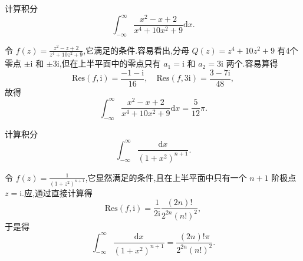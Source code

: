 \documentclass[../../main.tex]{subfiles}
\begin{document}
\begin{example}
计算积分
\[
\int_{-\infty}^{\infty} \frac{x^2 - x + 2}{x^4 + 10x^2 + 9} \mathrm{d}x.
\]
\end{example}
\begin{solution}
令 \( f(z) = \frac{z^2 - z + 2}{z^4 + 10z^2 + 9} \),它满足的条件.容易看出,分母 \( Q(z) = z^4 + 10z^2 + 9 \) 有4个零点 \( \pm \mathrm{i} \) 和 \( \pm 3\mathrm{i} \),但在上半平面中的零点只有 \( a_1 = \mathrm{i} \) 和 \( a_2 = 3\mathrm{i} \) 两个.容易算得
\[
\mathrm{Res}(f, \mathrm{i}) = \frac{-1 - \mathrm{i}}{16},
\quad
\mathrm{Res}(f, 3\mathrm{i}) = \frac{3 - 7\mathrm{i}}{48},
\]
故得
\[
\int_{-\infty}^{\infty} \frac{x^2 - x + 2}{x^4 + 10x^2 + 9} \mathrm{d}x = \frac{5}{12}\pi.
\]

\end{solution}

\begin{example}
计算积分
\[
\int_{-\infty}^{\infty} \frac{\mathrm{d}x}{(1 + x^2)^{n + 1}}.
\]
\end{example}
\begin{solution}
令 \( f(z) = \frac{1}{(1 + z^2)^{n + 1}} \),它显然满足的条件,且在上半平面中只有一个 \( n + 1 \) 阶极点 \( z = \mathrm{i} \).应,通过直接计算得
\[
\mathrm{Res}(f, \mathrm{i}) = \frac{1}{2\mathrm{i}} \frac{(2n)!}{2^{2n} (n!)^2},
\]
于是得
\[
\int_{-\infty}^{\infty} \frac{\mathrm{d}x}{(1 + x^2)^{n + 1}} = \frac{(2n)! \pi}{2^{2n} (n!)^2}.
\]

\end{solution}
\end{document}
